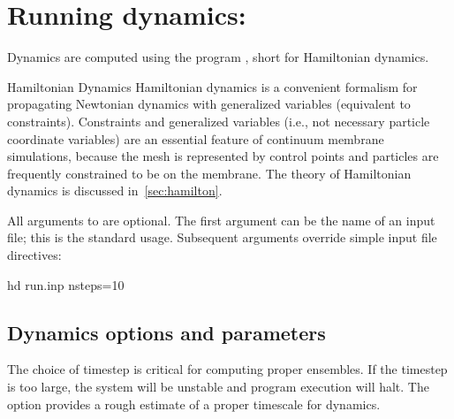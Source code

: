 
\section{ Running dynamics:  }

Dynamics are computed using the program , short for Hamiltonian dynamics. 

\begin{bcomment}{Hamiltonian Dynamics}
Hamiltonian dynamics is a convenient formalism for propagating Newtonian dynamics with generalized variables (equivalent to constraints). Constraints and generalized variables (i.e., not necessary particle coordinate variables) are an essential feature of continuum membrane simulations, because the mesh is represented by control points and particles are frequently constrained to be on the membrane. The theory of Hamiltonian dynamics is discussed in~\cref{sec:hamilton}. 
\end{bcomment}

All arguments to  are optional.
The first argument can be the name of an input file; this is the standard usage.
Subsequent arguments override simple input file directives:
\begin{command}
hd run.inp nsteps=10
\label{cmd:hd}
\end{command}


\subsection{Dynamics options and parameters }

The choice of timestep is critical for computing proper ensembles. 
If the timestep is too large, the system will be unstable and program execution will halt.
The option  provides a rough estimate of a proper timescale for dynamics.


